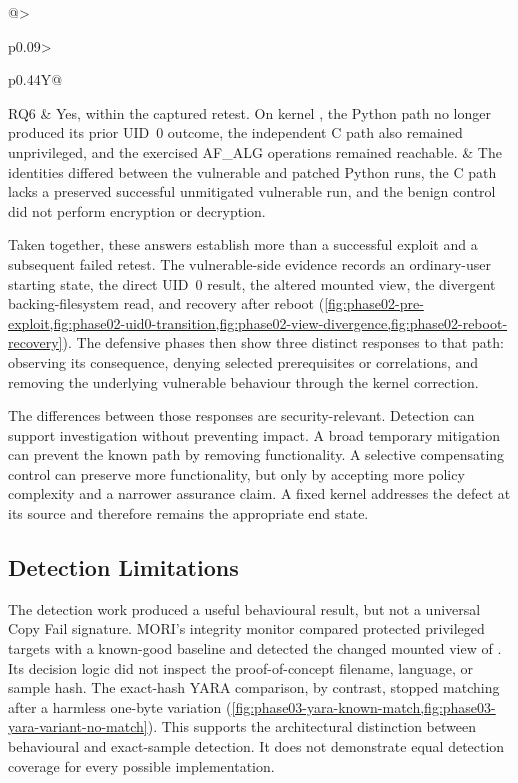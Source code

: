 \begin{table}[H]
\begin{tabularx}{\textwidth}{@{}>{\bfseries\raggedright\arraybackslash}p{}>{\raggedright\arraybackslash}p{}Y@{}}
        RQ6 &
        Yes, within the captured retest. On kernel
        , the Python path no longer produced its prior
        UID~0 outcome, the independent C path also remained unprivileged, and
        the exercised AF\_ALG operations remained reachable. &
        The identities differed between the vulnerable and patched Python runs,
        the C path lacks a preserved successful unmitigated vulnerable run, and
        the benign control did not perform encryption or decryption. \\
        \bottomrule
    \end{tabularx}
\end{table}

Taken together, these answers establish more than a successful exploit and a
subsequent failed retest. The vulnerable-side evidence records an ordinary-user
starting state, the direct UID~0 result, the altered mounted view, the divergent
backing-filesystem read, and recovery after reboot
(\cref{fig:phase02-pre-exploit,fig:phase02-uid0-transition,fig:phase02-view-divergence,fig:phase02-reboot-recovery}).
The defensive phases then show three distinct responses to that path: observing
its consequence, denying selected prerequisites or correlations, and removing
the underlying vulnerable behaviour through the kernel correction.

The differences between those responses are security-relevant. Detection can
support investigation without preventing impact. A broad temporary mitigation
can prevent the known path by removing functionality. A selective compensating
control can preserve more functionality, but only by accepting more policy
complexity and a narrower assurance claim. A fixed kernel addresses the defect
at its source and therefore remains the appropriate end state.

\subsection{Detection Limitations}

The detection work produced a useful behavioural result, but not a universal
Copy Fail signature. MORI's integrity monitor compared protected privileged
targets with a known-good baseline and detected the changed mounted view of
. Its decision logic did not inspect the proof-of-concept
filename, language, or sample hash. The exact-hash YARA comparison, by contrast,
stopped matching after a harmless one-byte variation
(\cref{fig:phase03-yara-known-match,fig:phase03-yara-variant-no-match}). This
supports the architectural distinction between behavioural and exact-sample
detection. It does not demonstrate equal detection coverage for every possible
implementation.

